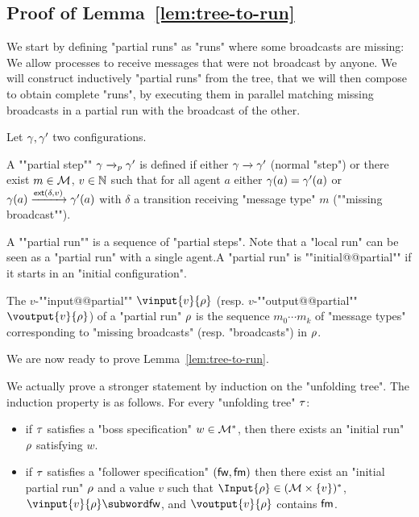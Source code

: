 \subsection{Proof of Lemma~\ref{lem:tree-to-run}}
\label{app:tree-to-run}

\LemTreeToRun*

We start by defining "partial runs" as "runs" where some broadcasts are missing: We allow processes to receive messages that were not broadcast by anyone. We will construct inductively "partial runs" from the tree, that we will then compose to obtain complete "runs", by executing them in parallel matching missing broadcasts in a partial run with the broadcast of the other.

\begin{definition}
	Let $\gamma, \gamma'$ two configurations. 
	
	A ""partial step"" $\gamma \xrightarrow{}_{p} \gamma'$ is defined if either $\gamma \xrightarrow{} \gamma'$ (normal "step") or there exist $m \in \mathcal{M}$, $v\in \mathbb{N}$ such that for all agent $a$ either $\gamma(a) = \gamma'(a)$ or $\gamma(a) \xrightarrow{\mathsf{ext}(\delta,v)} \gamma'(a)$ with $\delta$ a transition receiving "message type" $m$ (""missing broadcast"").
	
	A ""partial run"" is a sequence of "partial steps".
	Note that a "local run" can be seen as a "partial run" with a single agent.A "partial run" is ""initial@@partial"" if it starts in an "initial configuration".
	
	
	\AP The $v$-""input@@partial"" $\vinput{v}{\run}$ (resp. $v$-""output@@partial"" $\voutput{v}{\run}$) of a "partial run" $\rho$ is the sequence $m_0 \cdots m_k$ of "message types" corresponding to "missing broadcasts" (resp. "broadcasts") in $\rho$.
\end{definition}


We are now ready to prove Lemma~\ref{lem:tree-to-run}.

\LemTreeToRun*

We actually prove a stronger statement by induction on the "unfolding tree".
The induction property is as follows. For every "unfolding tree" $\tau$:
\begin{itemize}
	\item if $\tau$ satisfies a "boss specification" $w \in \mathcal{M}^*$, then there exists an "initial run" $\rho$ satisfying $w$.
	\item if $\tau$ satisfies a "follower specification" $(\mathsf{fw}, \mathsf{fm})$ then there exist an "initial partial run" $\rho$ and a value $v$ such that $\Input{\run} \in (\messages\times \set{v})^*$, $\vinput{v}{\run} \subword \followwordspec$, and $\voutput{v}{\run}$ contains $\mathsf{fm}$.
\end{itemize}

